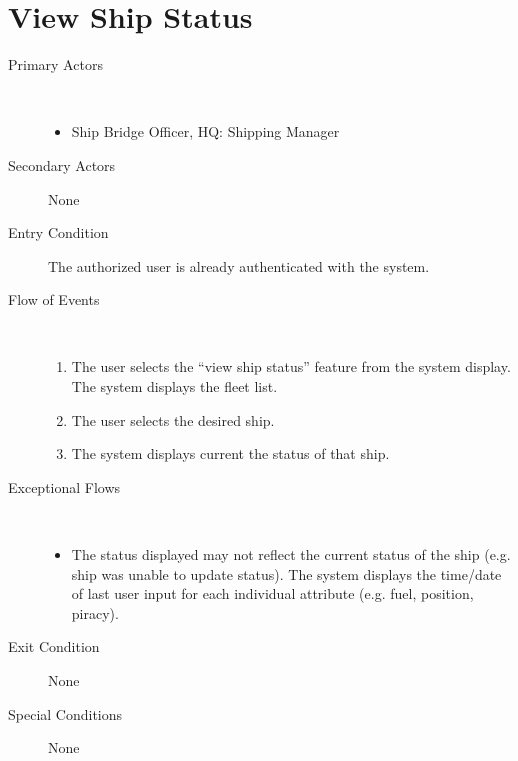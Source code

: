\documentclass[a4paper,10pt]{report}
\begin{document}
\section{View Ship Status}
\begin{description}
\item[Primary Actors] \
  \begin{itemize}
  \item Ship Bridge Officer, HQ: Shipping Manager
  \end{itemize}
\item[Secondary Actors] None
\item[Entry Condition]
  The authorized user is already authenticated with the system.
\item[Flow of Events] \
  \begin{enumerate}
  \item The user selects the ``view ship status'' feature from the system display. The system displays the fleet list.
  \item The user selects the desired ship.
  \item The system displays current the status of that ship.
  \end{enumerate}
\item[Exceptional Flows] \
  \begin{itemize}
   \item The status displayed may not reflect the current status of the ship (e.g. ship was unable to update status). The system displays the time/date of last user input for each individual attribute (e.g. fuel, position, piracy).
  \end{itemize}
\item[Exit Condition] None 
\item[Special Conditions] None  
\end{description}
\end{document}
